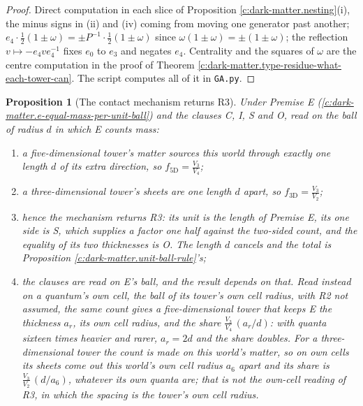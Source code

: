 \documentclass[11pt]{article}
\newtheorem{proposition}[theorem]{Proposition}
\theoremstyle{definition}
\theoremstyle{plain}
\newcommand{\changedmark}[2]{\marginpar{\raggedright\scriptsize\color{#1}#2}}
\begin{document}
\begin{proof}
Direct computation in each slice of Proposition \ref{c:dark-matter.nesting}(i), the minus signs in (ii) and (iv) coming from moving one generator past another; $e_{4}\cdot\tfrac{1}{2}(1 \pm \omega) = \pm P^{-1}\cdot\tfrac{1}{2}(1 \pm \omega)$ since $\omega(1 \pm \omega) = \pm(1 \pm \omega)$; the reflection $v \mapsto -e_{4}ve_{4}^{-1}$ fixes $e_{0}$ to $e_{3}$ and negates $e_{4}$. Centrality and the squares of $\omega$ are the centre computation in the proof of Theorem \ref{c:dark-matter.type-residue-what-each-tower-can}. The script computes all of it in \texttt{GA.py}.

\end{proof}

\begin{proposition}[The contact mechanism returns R3]\label{c:dark-matter.contact-mechanism-returns-r3}
\changedmark{BurntOrange}{changed since the deposit}
Under Premise E (\ref{c:dark-matter.e-equal-mass-per-unit-ball}) and the clauses C, I, S and O, read on the ball of radius $d$ in which E counts mass:
\begin{enumerate}
\item[(i)] a five-dimensional tower's matter sources this world through exactly one length $d$ of its extra direction, so $f_{5\mathrm{D}} = \tfrac{V_{3}}{V_{4}}$;
\item[(ii)] a three-dimensional tower's sheets are one length $d$ apart, so $f_{3\mathrm{D}} = \tfrac{V_{3}}{V_{2}}$;
\item[(iii)] hence the mechanism returns R3: its unit is the length of Premise E, its one side is S, which supplies a factor one half against the two-sided count, and the equality of its two thicknesses is O. The length $d$ cancels and the total is Proposition \ref{c:dark-matter.unit-ball-rule}'s;
\item[(iv)] the clauses are read on E's ball, and the result depends on that. Read instead on a quantum's own cell, the ball of its tower's own cell radius, with R2 not assumed, the same count gives a five-dimensional tower that keeps E the thickness $a_{r}$, its own cell radius, and the share $\tfrac{V_{3}}{V_{4}}\,(a_{r}/d)$: with quanta sixteen times heavier and rarer, $a_{r} = 2d$ and the share doubles. For a three-dimensional tower the count is made on this world's matter, so on own cells its sheets come out this world's own cell radius $a_{6}$ apart and its share is $\tfrac{V_{3}}{V_{2}}\,(d/a_{6})$, whatever its own quanta are; that is not the own-cell reading of R3, in which the spacing is the tower's own cell radius.

\end{enumerate}
\end{proposition}
\end{document}
